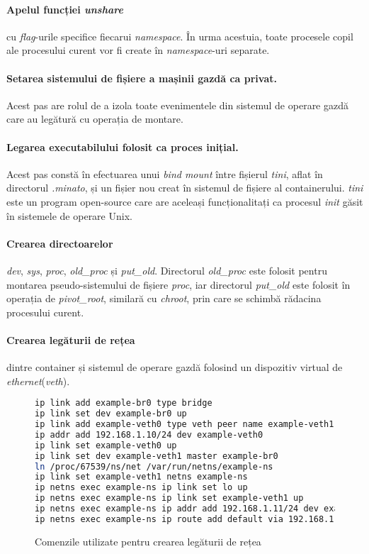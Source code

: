             \paragraph{Apelul funcției \textit{unshare}} cu \textit{flag}-urile specifice fiecarui \textit{namespace}. În urma acestuia, toate procesele copil ale procesului curent vor fi create în \textit{namespace}-uri separate.
            \paragraph{Setarea sistemului de fișiere a mașinii gazdă ca privat.} Acest pas are rolul de a izola toate evenimentele din sistemul de operare gazdă care au legătură cu operația de montare.
            \paragraph{Legarea executabilului folosit ca proces inițial.} Acest pas constă în efectuarea unui \textit{bind mount} între fișierul \textit{tini}, aflat în directorul \textit{.minato}, și un fișier nou creat în sistemul de fișiere al containerului. \textit{tini} este un program open-source care are aceleași funcționalitați ca procesul \textit{init} găsit în sistemele de operare Unix.
            \paragraph{Crearea directoarelor} \textit{dev}, \textit{sys}, \textit{proc}, \textit{old\_proc} și \textit{put\_old}. Directorul \textit{old\_proc} este folosit pentru montarea pseudo-sistemului de fișiere \textit{proc}, iar directorul \textit{put\_old} este folosit în operația de \textit{pivot\_root}, similară cu \textit{chroot}, prin care se schimbă rădacina procesului curent.
            \paragraph{Crearea legăturii de rețea} dintre container și sistemul de operare gazdă folosind un dispozitiv virtual de \textit{ethernet}(\textit{veth}).

            \begin{figure}[h!]
                \begin{lstlisting}[language=bash, style=boxed]
ip link add example-br0 type bridge
ip link set dev example-br0 up
ip link add example-veth0 type veth peer name example-veth1
ip addr add 192.168.1.10/24 dev example-veth0
ip link set example-veth0 up
ip link set dev example-veth1 master example-br0
ln /proc/67539/ns/net /var/run/netns/example-ns
ip link set example-veth1 netns example-ns
ip netns exec example-ns ip link set lo up
ip netns exec example-ns ip link set example-veth1 up
ip netns exec example-ns ip addr add 192.168.1.11/24 dev example-veth1
ip netns exec example-ns ip route add default via 192.168.1.11/24 \end{lstlisting}
                \caption{Comenzile utilizate pentru crearea legăturii de rețea}
                \label{fig:cod_net}
            \end{figure}
